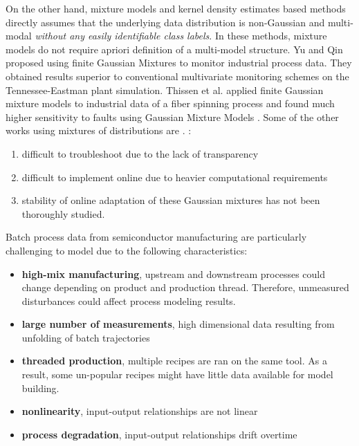 \documentclass[review,3p]{elsarticle}
\renewcommand\[{\begin{equation}}
\renewcommand\]{\end{equation}}
\begin{document}
On the other hand, mixture models and kernel density
estimates based methods directly assumes that the underlying data distribution is
non-Gaussian and multi-modal \emph{without any easily identifiable class
labels}. In these methods, mixture models do not
require apriori definition of a multi-model structure. Yu and Qin
\cite{Yu2008} proposed using finite Gaussian Mixtures to monitor industrial process data. They
obtained results superior to conventional multivariate monitoring schemes
on the Tennessee-Eastman plant simulation. Thissen et al. applied finite Gaussian
mixture models to industrial data of a fiber spinning process and found much
higher sensitivity to faults using Gaussian Mixture Models
\cite{Thissen2005}.  Some of the other works using mixtures of distributions are
\cite{Yu2011,yoo2007multi,zhao2010statistical,zhao2004monitoring}. :
\begin{enumerate}
\item difficult to troubleshoot due to the lack of transparency
\item difficult to implement online due to heavier computational
    requirements
\item stability of online adaptation of these Gaussian mixtures has not
    been thoroughly studied.
\end{enumerate}
Batch process data from semiconductor manufacturing are particularly
challenging to model due to the following characteristics:
\begin{itemize}
    \item \textbf{high-mix manufacturing}, upstream and downstream
        processes could change depending on product and production thread.
        Therefore, unmeasured disturbances could affect process modeling
        results.
    \item \textbf{large number of measurements}, high dimensional data
        resulting from unfolding of batch trajectories
    \item \textbf{threaded production}, multiple recipes are ran on the
        same tool. As a result, some un-popular recipes might have little
        data available for model building.
    \item \textbf{nonlinearity}, input-output relationships are not linear
    \item \textbf{process degradation}, input-output relationships drift
        overtime
\end{itemize}
\end{document}
